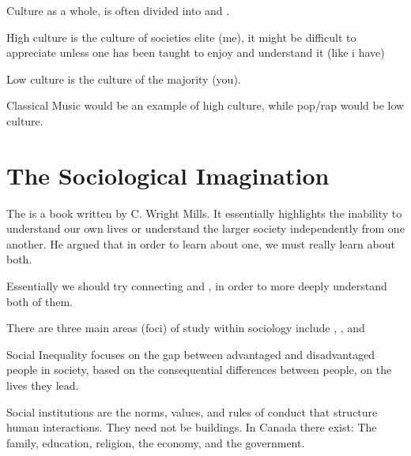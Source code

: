 Culture as a whole, is often divided into  and .
\begin{bullets}
	\item High culture is the culture of societies elite (me), it might be difficult to appreciate unless one has been taught to enjoy and understand it (like i have)
	\item Low culture is the culture of the majority (you).
	\item Classical Music would be an example of high culture, while pop/rap would be low culture.
\end{bullets}

\section{The Sociological Imagination}

The  is a book written by C. Wright Mills. It essentially highlights the inability to understand our own lives or understand the larger society independently from one another. He argued that in order to learn about one, we must really learn about both.
\begin{bullets}
	\item Essentially we should try connecting  and , in order to more deeply understand both of them.
\end{bullets}

There are three main areas (foci) of study within sociology include , , and 
\begin{bullets}
	\item Social Inequality focuses on the gap between advantaged and disadvantaged people in society, based on the consequential differences between people, on the lives they lead.
	\item Social institutions are the norms, values, and rules of conduct that structure human interactions. They need not be buildings. In Canada there exist: The family, education, religion, the economy, and the government.
\end{bullets}
